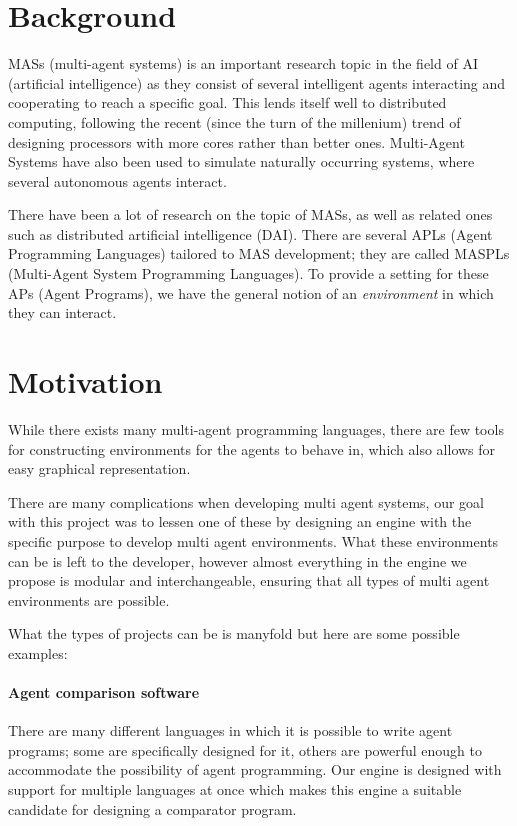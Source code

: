 
\section*{Background}

MASs (multi-agent systems) is an important research topic in the field
of AI (artificial intelligence) as they consist of several intelligent
agents interacting and cooperating to reach a specific goal. This
lends itself well to distributed computing, following the recent (since
the turn of the millenium) trend of designing processors with more
cores rather than better ones. Multi-Agent Systems have also been
used to simulate naturally occurring systems, where several autonomous
agents interact. 

There have been a lot of research on the topic of MASs, as well as
related ones such as distributed artificial intelligence (DAI). There
are several APLs (Agent Programming Languages) tailored to MAS development;
they are called MASPLs (Multi-Agent System Programming Languages).
To provide a setting for these APs (Agent Programs), we have the general
notion of an \emph{environment} in which they can interact. 


\section*{Motivation}

While there exists many multi-agent programming languages, there are
few tools for constructing environments for the agents to behave in,
which also allows for easy graphical representation. 

There are many complications when developing multi agent systems,
our goal with this project was to lessen one of these by designing
an engine with the specific purpose to develop multi agent environments.
What these environments can be is left to the developer, however almost
everything in the engine we propose is modular and interchangeable,
ensuring that all types of multi agent environments are possible. 

What the types of projects can be is manyfold but here are some possible
examples:


\paragraph*{Agent comparison software}

There are many different languages in which it is possible to write
agent programs; some are specifically designed for it, others are
powerful enough to accommodate the possibility of agent programming.
Our engine is designed with support for multiple languages at once
which makes this engine a suitable candidate for designing a comparator
program. 

